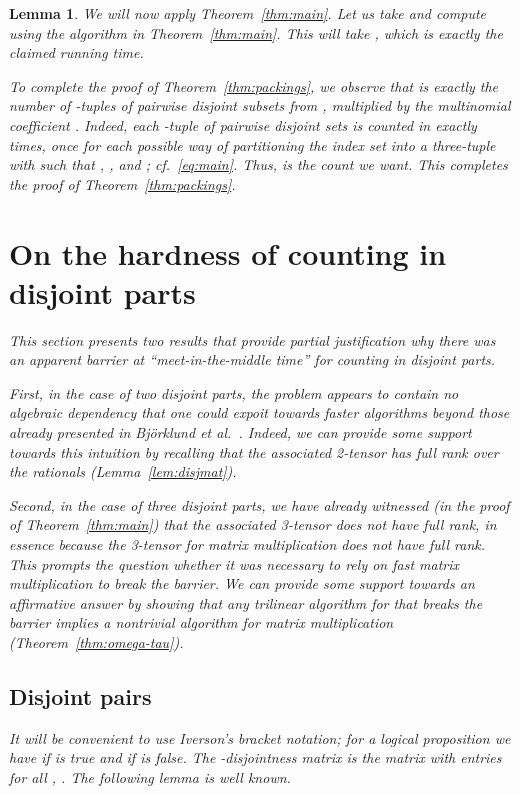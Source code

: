 \documentclass{amsart}
\newtheorem{Lem}{Lemma}
\begin{document}
\begin{Lem}
We will now apply Theorem~\ref{thm:main}. Let us take
 and compute  using
the algorithm in Theorem~\ref{thm:main}. This will take
, which is exactly
the claimed running time. 

To complete the proof of Theorem~\ref{thm:packings}, we observe 
that 
is exactly the number of -tuples of pairwise disjoint subsets
from , multiplied by the multinomial coefficient
. Indeed, each -tuple 
 of pairwise disjoint sets 
is counted in  exactly 
 times, once for each possible way of 
partitioning the index set  into a three-tuple 
 with  such that 
, , 
and ; cf.~\eqref{eq:main}. 
Thus, 
is the count we want. This completes the proof of Theorem~\ref{thm:packings}.

\section{On the hardness of counting in disjoint parts}
\label{sect:lower-bounds}

This section presents two results that provide partial
justification why there was an apparent barrier 
at ``meet-in-the-middle time'' for counting in disjoint parts. 

First, in the case of two disjoint parts, the problem appears to
contain no algebraic dependency that one could expoit towards
faster algorithms beyond those already presented in 
Bj\"orklund {\em et al.}~\cite{BHKK08,BHKK09}. Indeed, we can
provide some support towards this intuition by recalling that
the associated 2-tensor has full rank over the rationals
(Lemma~\ref{lem:disjmat}).

Second, in the case of three disjoint parts, we have already
witnessed (in the proof of Theorem~\ref{thm:main}) that the
associated 3-tensor does not have full rank, in essence
because the 3-tensor for matrix multiplication does
not have full rank. This prompts the question whether it was
{\em necessary} to rely on fast matrix multiplication 
to break the barrier. We can provide some support towards an 
affirmative answer by showing that any {\em trilinear} algorithm 
for  that breaks the barrier implies a nontrivial algorithm 
for matrix multiplication (Theorem~\ref{thm:omega-tau}).

\subsection{Disjoint pairs}
It will be convenient to use Iverson's bracket notation;
for a logical proposition  we have  if  is true and  if
 is false. The -{\em disjointness matrix} is the 
 matrix with entries 
for all , .
The following lemma is well known.


\end{Lem}
\end{document}
